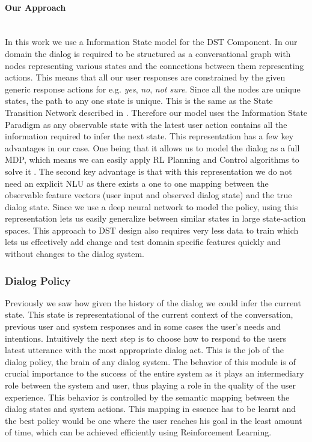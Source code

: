\documentclass[14pt]{extarticle}
\newcommand{\myparagraph}[1]{\paragraph{#1}\mbox{}\\ \linebreak}
\numberwithin{equation}{section}
\begin{document}
	\myparagraph{Our Approach}	
	In this work we use a Information State model for the DST Component. In our domain the dialog is required to be structured as a conversational graph with nodes representing various states and the connections between them representing actions. This means that all our user responses are constrained by the given generic response actions for e.g. \textit{yes}, \textit{no}, \textit{not sure}. Since all the nodes are unique states, the path to any one state is unique. This is the same as the State Transition Network described in \cite{Sutton-introRL}. Therefore our model uses the Information State Paradigm \cite{Larsson:2000:ISD:973935.973943} as any observable state  with the latest user action contains all the information required to infer the next state. This representation has a few key advantages in our case. One being that it allows us to model the dialog as a full MDP, which means we can easily apply RL Planning and Control algorithms to solve it \cite{Sutton-introRL}.  The second key advantage is that with this representation we do not need an explicit NLU as there exists a one to one mapping between the observable feature vectors (user input and observed dialog state) and the true dialog state. Since we use a deep neural network to model the policy, using this representation lets us easily generalize between similar states in large state-action spaces. This approach to DST design also requires very less data to train which lets us effectively add change and test domain specific features quickly and without changes to the dialog system.
	\subsubsection{Dialog Policy} 
	Previously we saw how given the history of the dialog we could infer the current state. This state is representational of the current context of the conversation, previous user and system responses and in some cases the user's needs and intentions. Intuitively the next step is to choose how to respond to the users latest utterance with the most appropriate dialog act. This is the job of the dialog policy, the brain of any dialog system. The behavior of this module is of crucial importance to the success of the entire system as it plays an intermediary role between the system and user, thus playing a role in the quality of the user experience. This behavior is controlled by the semantic mapping between the dialog states and system actions. This mapping in essence has to be learnt and the best policy would be one where the user reaches his goal in the least amount of time, which can be achieved efficiently using Reinforcement Learning. 
	
\end{document}
